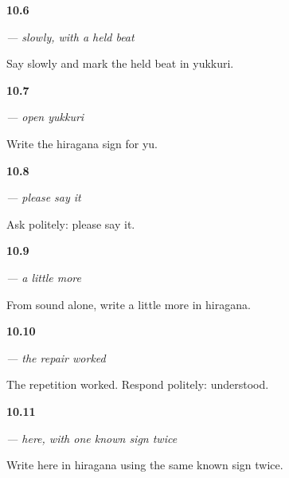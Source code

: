 \noindent\begin{minipage}[t]{\linewidth}
\raggedright
\hypertarget{review-JA-C10-yukkuri-timing}{\textbf{10.6}} \emph{ — slowly, with a held beat}\par
\small Say slowly and mark the held beat in yukkuri.
\end{minipage}\par\medskip

\noindent\begin{minipage}[t]{\linewidth}
\raggedright
\hypertarget{review-JA-W10-yu-write}{\textbf{10.7}} \emph{ — open yukkuri}\par
\small Write the hiragana sign for yu.
\end{minipage}\par\medskip

\noindent\begin{minipage}[t]{\linewidth}
\raggedright
\hypertarget{review-JA-C10-itte-kudasai-request}{\textbf{10.8}} \emph{ — please say it}\par
\small Ask politely: please say it.
\end{minipage}\par\medskip

\noindent\begin{minipage}[t]{\linewidth}
\raggedright
\hypertarget{review-JA-C10-mou-sukoshi-write}{\textbf{10.9}} \emph{ — a little more}\par
\small From sound alone, write a little more in hiragana.
\end{minipage}\par\medskip

\noindent\begin{minipage}[t]{\linewidth}
\raggedright
\hypertarget{review-JA-C10-wakarimashita-success}{\textbf{10.10}} \emph{ — the repair worked}\par
\small The repetition worked. Respond politely: understood.
\end{minipage}\par\medskip

\noindent\begin{minipage}[t]{\linewidth}
\raggedright
\hypertarget{review-JA-C10-koko-write}{\textbf{10.11}} \emph{ — here, with one known sign twice}\par
\small Write here in hiragana using the same known sign twice.
\end{minipage}\par\medskip

